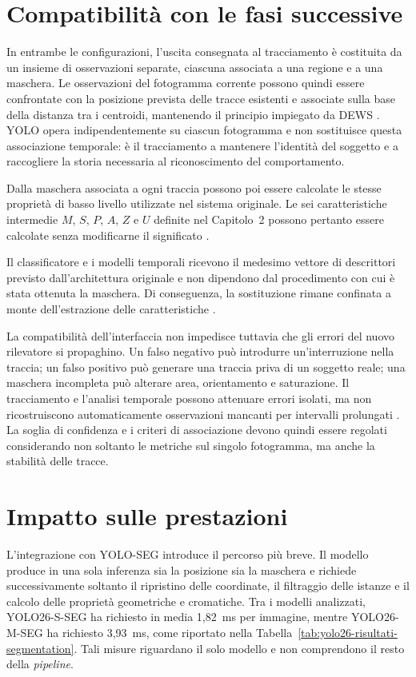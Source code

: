 \section{Compatibilità con le fasi successive}

In entrambe le configurazioni, l'uscita consegnata al tracciamento è costituita da un insieme di osservazioni separate, ciascuna associata a una regione e a una maschera. Le osservazioni del fotogramma corrente possono quindi essere confrontate con la posizione prevista delle tracce esistenti e associate sulla base della distanza tra i centroidi, mantenendo il principio impiegato da DEWS \cite{Eng2008DEWS}. YOLO opera indipendentemente su ciascun fotogramma e non sostituisce questa associazione temporale: è il tracciamento a mantenere l'identità del soggetto e a raccogliere la storia necessaria al riconoscimento del comportamento.

Dalla maschera associata a ogni traccia possono poi essere calcolate le stesse proprietà di basso livello utilizzate nel sistema originale. Le sei caratteristiche intermedie $M$, $S$, $P$, $A$, $Z$ e $U$ definite nel Capitolo~2 possono pertanto essere calcolate senza modificarne il significato \cite{Eng2008DEWS}.

Il classificatore e i modelli temporali ricevono il medesimo vettore di descrittori previsto dall'architettura originale e non dipendono dal procedimento con cui è stata ottenuta la maschera. Di conseguenza, la sostituzione rimane confinata a monte dell'estrazione delle caratteristiche \cite{Eng2008DEWS}.

La compatibilità dell'interfaccia non impedisce tuttavia che gli errori del nuovo rilevatore si propaghino. Un falso negativo può introdurre un'interruzione nella traccia; un falso positivo può generare una traccia priva di un soggetto reale; una maschera incompleta può alterare area, orientamento e saturazione. Il tracciamento e l'analisi temporale possono attenuare errori isolati, ma non ricostruiscono automaticamente osservazioni mancanti per intervalli prolungati \cite{Eng2008DEWS}. La soglia di confidenza e i criteri di associazione devono quindi essere regolati considerando non soltanto le metriche sul singolo fotogramma, ma anche la stabilità delle tracce.

\section{Impatto sulle prestazioni}

L'integrazione con YOLO-SEG introduce il percorso più breve. Il modello produce in una sola inferenza sia la posizione sia la maschera e richiede successivamente soltanto il ripristino delle coordinate, il filtraggio delle istanze e il calcolo delle proprietà geometriche e cromatiche. Tra i modelli analizzati, YOLO26-S-SEG ha richiesto in media 1{,}82~ms per immagine, mentre YOLO26-M-SEG ha richiesto 3{,}93~ms, come riportato nella Tabella~\ref{tab:yolo26-risultati-segmentation}. Tali misure riguardano il solo modello e non comprendono il resto della \textit{pipeline}.

